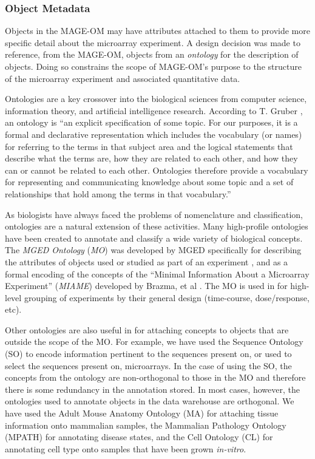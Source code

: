 \subsubsection{Object Metadata}
\label{Object Metadata}

Objects in the MAGE-OM may have attributes attached to them to provide
more specific detail about the microarray experiment.  A design decision was
made to reference, from the MAGE-OM, objects from an \emph{ontology} for the
description of objects.  Doing so constrains the scope of MAGE-OM's purpose to
the structure of the microarray experiment and associated quantitative data.

Ontologies are a key crossover into the biological sciences from computer
science, information theory, and artificial intelligence research.  According
to T. Gruber \cite{gruber}, an ontology is ``an explicit specification of some
topic. For our purposes, it is a formal and declarative representation which
includes the vocabulary (or names) for referring to the terms in that subject
area and the logical statements that describe what the terms are, how they are
related to each other, and how they can or cannot be related to each other.
Ontologies therefore provide a vocabulary for representing and communicating
knowledge about some topic and a set of relationships that hold among the terms
in that vocabulary.''

As biologists have always faced the problems of nomenclature and
classification, ontologies are a natural extension of these activities.  Many
high-profile ontologies have been created to annotate and classify a wide
variety of biological concepts.  The \emph{MGED Ontology} (\emph{MO}) was
developed by MGED specifically for describing the attributes of objects used or
studied as part of an experiment \cite{mo}, and as a formal encoding of the
concepts of the ``Minimal Information About a Microarray Experiment''
(\emph{MIAME}) developed by Brazma, et al \cite{miame}.  The MO is used
in \dbthesis for high-level grouping of experiments by their general design
(time-course, dose/response, etc).

Other ontologies are also useful in \dbthesis for attaching concepts to objects
that are outside the scope of the MO.  For example, we have used the Sequence
Ontology (SO) \cite{so} to encode information pertinent to the sequences
present on, or used to select the sequences present on, microarrays.  In
the case of using the SO, the concepts from the ontology are non-orthogonal to
those in the MO and therefore there is some redundancy in the annotation
stored.  In most cases, however, the ontologies used to annotate objects in the
data warehouse are orthogonal.  We have used the Adult Mouse Anatomy Ontology
(MA) \cite{ma} for attaching tissue information onto mammalian samples, the
Mammalian Pathology Ontology (MPATH) \cite{mpath} for annotating disease
states, and the Cell Ontology (CL) \cite{cl} for annotating cell type onto
samples that have been grown \emph{in-vitro}.

